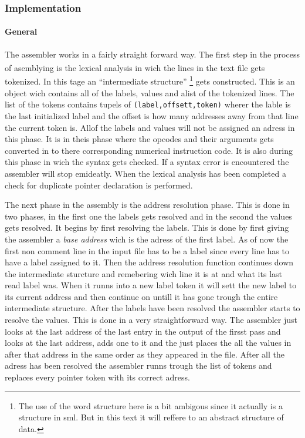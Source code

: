 \documentclass{article}
\begin{document}
\subsubsection{Implementation}
\paragraph{General}
The assembler works in a fairly straight forward way. The first step in the
process of asemblying is the lexical
analysis\textsuperscript{\cite{lexi}} in wich the lines in the text file gets tokenized. In this tage an ``intermediate structure''
\footnote{The use of the word structure here is a bit ambigous since it
actually is a structure in sml. But in this text it will reffere to an abstract
structure of data.} gets constructed.
This is an object wich contains all of the labels, values and alist of the tokenized lines. The list of 
the tokens contains tupels of
\verb+(label,offsett,token)+ wherer the lable is the last initialized label and
the offset is how many addresses away from that line the current token is. Allof
the labels and values will not be assigned an adress in this phase. It is in
theis phase where the opcodes and their arguments gets converted in to there
corresponding numerical instruction code. It is also during this phase in wich
the syntax gets checked. If a syntax error is encountered the assembler will
stop emideatly. When the lexical analysis has been completed a check for
duplicate pointer declaration is performed.

The next phase in the assembly is the address resolution phase. This is done in
two phases, in the first one the labels gets resolved and in the second the
values gets  resolved. It begins by first resolving the labels.
This is done by first giving the assembler a \emph{base address} wich is 
the adress of the first label. As of now the first
non comment line in the input file has to be a label since every line has to
have a label assigned to it. Then the address resolution function continues down
the intermediate sturcture and remebering wich line it is at and what its last
read label was. When it runns into a new label token it will sett the new label
to its current address and then continue on untill it has gone trough the entire
intermediate structure. After the labels have been resolved the assembler starts
to resolve the values. This is done in a very straightforward way. The assembler
just looks at the last address of the last entry in the output of the firsst
pass and looks at the last address, adds one to it and the just places the all
the values in after that address in the same order as they appeared in the file.
After all the adress has been resolved the assembler runns trough the list of
tokens and replaces every pointer token with its correct adress.
\end{document}

